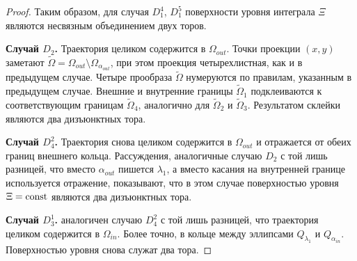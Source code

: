\begin{proof}
%
%
%
Таким образом, для случая  $D_1^4$, $D_1^5$ поверхности уровня интеграла $\Xi$ являются  несвязным объединением двух торов.

\medskip
\textbf{Случай $D_2$.} 
Траектория целиком содержится в $\Omega_{out}$. Точки проекции $(x,y)$ заметают $\widetilde{\Omega} = \Omega_{out} \setminus \Omega_{\alpha_{out}}$, при этом проекция четырехлистная, как и в предыдущем случае. 
Четыре прообраза $\widetilde{\Omega}$ нумеруются по правилам, указанным в предыдущем случае. 
Внешние и внутренние границы $\widetilde{\Omega}_1$ подклеиваются к соответствующим границам $\widetilde{\Omega}_4$, аналогично для $\widetilde{\Omega}_2$ и $\widetilde{\Omega}_3$. Результатом склейки являются два дизъюнктных тора.

\medskip
\textbf{Случай $D_4^2$. } Траектория снова целиком содержится в $\Omega_{out}$ и отражается от обеих границ внешнего кольца. Рассуждения, аналогичные случаю $D_2$ с той лишь разницей, что вместо $\alpha_{out}$ пишется $\lambda_1$, а вместо касания на внутренней границе используется отражение, показывают, что в этом случае поверхностью уровня $\Xi=\mathrm{const}$ являются два дизъюнктных тора.

\medskip
\textbf{Случай $D_3^1$. } аналогичен случаю $D_4^2$ с той лишь разницей, что траектория целиком содержится в $\Omega_{in}$. Более точно, в кольце между эллипсами $Q_{\lambda_1}$ и $Q_{\alpha_{in}}$. Поверхностью уровня снова служат два тора.


\end{proof}
